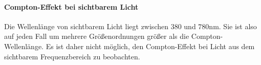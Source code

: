 \paragraph{Compton-Effekt bei sichtbarem Licht}

Die Wellenlänge von sichtbarem Licht liegt zwischen $380$ und $780 \si{\nano\m}$. Sie ist 
also auf jeden Fall um mehrere Größenordnungen größer als die Compton-Wellenlänge. Es ist daher
nicht möglich, den Compton-Effekt bei Licht aus dem sichtbarem Frequenzbereich zu beobachten. 
